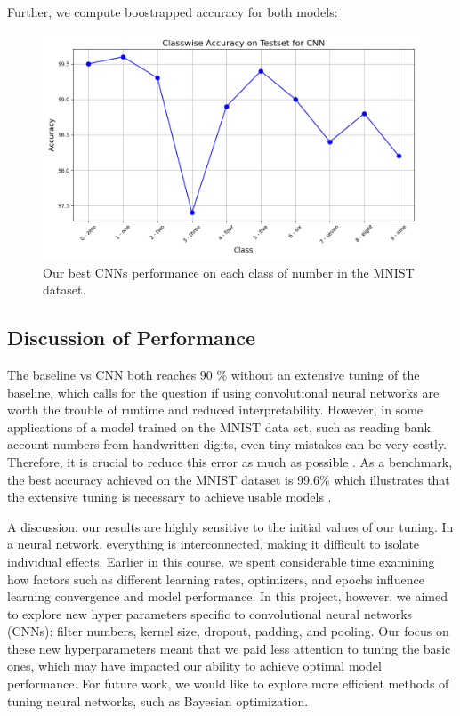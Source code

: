 Further, we compute boostrapped accuracy for both models:
\begin{figure}[H]
    \centering
    \includegraphics[width=\linewidth]{results/evaluation/CNN_classwise_acc.png}
    \caption{Our best CNNs performance on each class of number in the MNIST dataset.}
    \label{fig:ClasswiseAccuracyCNN}
\end{figure}
\newpage
\subsection{Discussion of Performance}
The baseline vs CNN both reaches 90 \% without an extensive tuning of the baseline, which calls for the question if using convolutional neural networks are worth the trouble of runtime and reduced interpretability. However, in some applications of a model trained on the MNIST data set, such
as reading bank account numbers from handwritten digits, even tiny mistakes can be very costly.
Therefore, it is crucial to reduce this error as much as possible \cite{raschka2022machine}. As a benchmark, the best accuracy achieved on the MNIST dataset is 99.6\% which illustrates that the extensive tuning is necessary to achieve usable models \cite{simard2003mnist}.

A discussion: our results are highly sensitive to the initial values of our tuning. In a neural network, everything is interconnected, making it difficult to isolate individual effects. Earlier in this course, we spent considerable time examining how factors such as different learning rates, optimizers, and epochs influence learning convergence and model performance. In this project, however, we aimed to explore new hyper parameters specific to convolutional neural networks (CNNs): filter numbers, kernel size, dropout, padding, and pooling. Our focus on these new hyperparameters meant that we paid less attention to tuning the basic ones, which may have impacted our ability to achieve optimal model performance. For future work, we would like to explore more efficient methods of tuning neural networks, such as Bayesian optimization.

